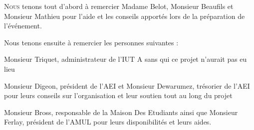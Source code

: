 \lettrine{N}{ous} tenons tout d'abord à remercier Madame Belot, Monsieur Beaufils et Monsieur Mathieu
pour l'aide et les conseils apportés lors de la préparation de l'événement.

Nous tenons ensuite à remercier les personnes suivantes :

Monsieur Triquet, administrateur de l'IUT A sans qui ce projet n'aurait pas eu lieu

Monsieur Digeon, président de l'AEI et Monsieur Dewarumez, trésorier de l'AEI pour leurs conseils
sur l'organisation et leur soutien tout au long du projet

Monsieur Bross, responsable de la Maison Des Etudiants ainsi que Monsieur Ferlay, président de l'AMUL
pour leurs disponibilités et leurs aides.
